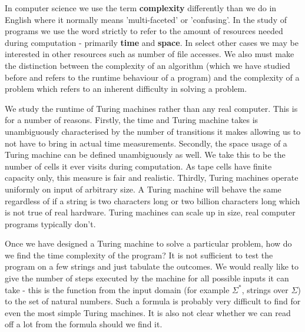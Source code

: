 \documentclass[11pt]{article}
\begin{document}
	\par 
	In computer science we use the term \textbf{complexity} differently than we do in English where it normally means 'multi-faceted' or 'confusing'. In the study of programs we use the word strictly to refer to the amount of resources needed during computation - primarily \textbf{time} and \textbf{space}. In select other cases we may be interested in other resources such as number of file accesses. We also must make the distinction between the complexity of an algorithm (which we have studied before and refers to the runtime behaviour of a program) and the complexity of a problem which refers to an inherent difficulty in solving a problem. 
	
	\par 
	We study the runtime of Turing machines rather than any real computer. This is for a number of reasons. Firstly, the time and Turing machine takes is unambiguously characterised by the number of transitions it makes allowing us to not have to bring in actual time measurements. Secondly, the space usage of a Turing machine can be defined unambiguously as well. We take this to be the number of cells it ever visits during computation. As tape cells have finite capacity only, this measure is fair and realistic. Thirdly, Turing machines operate uniformly on input of arbitrary size. A Turing machine will behave the same regardless of if a string is two characters long or two billion characters long which is not true of real hardware. Turing machines can scale up in size, real computer programs typically don't.
	
	\par 
	Once we have designed a Turing machine to solve a particular problem, how do we find the time complexity of the program? It is not sufficient to test the program on a few strings and just tabulate the outcomes. We would really like to give the number of steps executed by the machine for all possible inputs it can take - this is the function from the input domain (for example $\Sigma^{*}$, strings over $\Sigma$) to the set of natural numbers. Such a formula is probably very difficult to find for even the most simple Turing machines. It is also not clear whether we can read off a lot from the formula should we find it.
	
\end{document}
